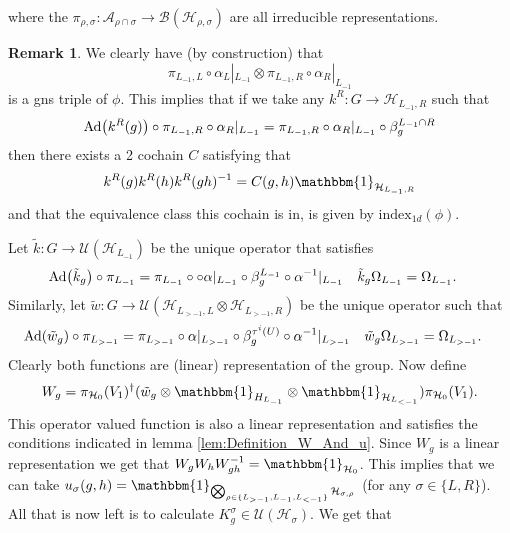 \documentclass[12pt,a4paper,twoside]{article}
\let\originalleft\left
\let\originalright\right
\renewcommand{\left}{\mathopen{}\mathclose\bgroup\originalleft}
\renewcommand{\right}{\aftergroup\egroup\originalright}
\newcommand{\UU}{\mathcal U}
\newcommand{\BB}{\mathcal B}
\newcommand{\HH}{\mathcal H}
\renewcommand{\AA}{\mathcal A}
\newcommand{\id}{\mathbbm{1}}
\newcommand{\Ad}[1]{\textrm{Ad}\left(#1\right)}
\theoremstyle{definition}
\newtheorem{remark}[theorem]{Remark}
\numberwithin{equation}{section}
\begin{document}
where the $\pi_{\rho,\sigma}:\AA_{\rho\cap\sigma}\rightarrow\BB(\HH_{\rho,\sigma})$ are all irreducible representations.
\begin{remark}\label{rem:GNS_One_Dimensional}
	We clearly have (by construction) that
	\begin{equation}
		\pi_{L_{-1},L}\circ\alpha_L|_{L_{-1}}\otimes \pi_{L_{-1},R}\circ\alpha_R|_{L_{-1}}
	\end{equation}
	is a gns triple of $\phi$. This implies that if we take any $k^R:G\rightarrow \HH_{L_{-1},R}$ such that
	\begin{equation}
		\Ad{k^R(g)}\circ\pi_{L_{-1},R}\circ\alpha_R|_{L_{-1}}=\pi_{L_{-1},R}\circ\alpha_R|_{L_{-1}}\circ\beta_{g}^{L_{-1}\cap R}
	\end{equation}
	then there exists a 2 cochain $C$ satisfying that
	\begin{equation}
		k^R(g)k^R(h)k^R(gh)^{-1}=C(g,h)\id_{\HH_{L_{-1},R}}
	\end{equation}
	and that the equivalence class this cochain is in, is given by $\textrm{index}_{1d}(\phi)$.
\end{remark}
Let $\tilde k:G\rightarrow \UU(\HH_{L_{-1}})$ be the unique operator that satisfies
\begin{align}
	\Ad{\tilde{k}_g}\circ\pi_{L_{-1}}&=\pi_{L_{-1}}\circ \circ\alpha|_{L_{-1}}\circ\beta_g^{L_{-1}}\circ \alpha^{-1}|_{L_{-1}}&\tilde k_g\Omega_{L_{-1}}&=\Omega_{L_{-1}}.
\end{align}
Similarly, let $\tilde{w}:G\rightarrow\UU(\HH_{L_{>-1},L}\otimes\HH_{L_{>-1},R})$ be the unique operator such that
\begin{align}
	\Ad{\tilde w_{g}}\circ\pi_{L_{>-1}}&=\pi_{L_{>-1}}\circ\alpha|_{L_{>-1}}\circ\beta_g^{\tau^{i}(U)}\circ \alpha^{-1}|_{L_{>-1}}&\tilde w_{g}\Omega_{L_{>-1}}&=\Omega_{L_{>-1}}.
\end{align}
Clearly both functions are (linear) representation of the group. Now define
\begin{equation}
	W_g=\pi_{\HH_0}(V_1)^{\dagger}(\tilde{w}_g\otimes\id_{H_{L_{-1}}}\otimes\id_{\HH_{L_{<-1}}}) \pi_{\HH_0}(V_1).
\end{equation}
This operator valued function is also a linear representation and satisfies the conditions indicated in lemma \ref{lem:Definition_W_And_u}. Since $W_g$ is a linear representation we get that $W_gW_hW_{gh}^{-1}=\id_{\HH_0}$. This implies that we can take $u_\sigma(g,h)=\id_{\bigotimes_{\rho\in\{L_{>-1},L_{-1},L_{<-1}\}}\HH_{\sigma,\rho}}$ (for any $\sigma\in\{L,R\}$). All that is now left is to calculate $K^\sigma_g\in\UU(\HH_\sigma)$. We get that
\end{document}
